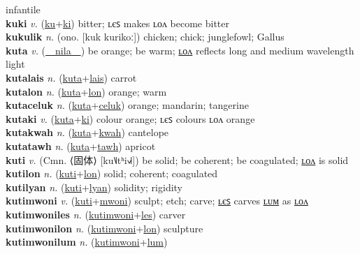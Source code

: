 infantile \label{kukamak} \\
\textbf{kuki} \textit{v.} (\hyperref[ku]{ku}+\hyperref[ki]{ki})
bitter; ʟєꜱ makes ʟᴏᴧ become bitter \label{kuki} \\
\textbf{kukulik} \textit{n.} (ono. [kuk kurikoː])
chicken; chick; junglefowl; Gallus \label{kukulik} \\
\textbf{kuta} \textit{v.} (\hyperref[nila]{~~nila~~})
be orange; be warm; \hyperref[kutalon]{ʟᴏᴧ} reflects long and medium wavelength light \label{kuta} \\
\textbf{kutalais} \textit{n.} (\hyperref[kuta]{kuta}+\hyperref[lais]{lais})
carrot \label{kutalais} \\
\textbf{kutalon} \textit{n.} (\hyperref[kuta]{kuta}+\hyperref[lon]{lon})
orange; warm \label{kutalon} \\
\textbf{kutaceluk} \textit{n.} (\hyperref[kuta]{kuta}+\hyperref[celuk]{celuk})
orange; mandarin; tangerine \label{kutaceluk} \\
\textbf{kutaki} \textit{v.} (\hyperref[kuta]{kuta}+\hyperref[ki]{ki})
colour orange; ʟєꜱ colours ʟᴏᴧ orange \label{kutaki} \\
\textbf{kutakwah} \textit{n.} (\hyperref[kuta]{kuta}+\hyperref[kwah]{kwah})
cantelope \label{kutakwah} \\
\textbf{kutatawh} \textit{n.} (\hyperref[kuta]{kuta}+\hyperref[tawh]{tawh})
apricot \label{kutatawh} \\
\textbf{kuti} \textit{v.} (Cmn. ⟨固体⟩ [ku˥˩tʰi˧˩˧])
be solid; be coherent; be coagulated; \hyperref[kutilon]{ʟᴏᴧ} is solid \label{kuti} \\
\textbf{kutilon} \textit{n.} (\hyperref[kuti]{kuti}+\hyperref[lon]{lon})
solid; coherent; coagulated \label{kutilon} \\
\textbf{kutilyan} \textit{n.} (\hyperref[kuti]{kuti}+\hyperref[lyan]{lyan})
solidity; rigidity \label{kutilyan} \\
\textbf{kutimwoni} \textit{v.} (\hyperref[kuti]{kuti}+\hyperref[mwoni]{mwoni})
sculpt; etch; carve; \hyperref[kutimwoniles]{ʟєꜱ} carves \hyperref[kutimwonilum]{ʟᴜᴍ} as \hyperref[kutimwonilon]{ʟᴏᴧ} \label{kutimwoni} \\
\textbf{kutimwoniles} \textit{n.} (\hyperref[kutimwoni]{kutimwoni}+\hyperref[les]{les})
carver \label{kutimwoniles} \\
\textbf{kutimwonilon} \textit{n.} (\hyperref[kutimwoni]{kutimwoni}+\hyperref[lon]{lon})
sculpture \label{kutimwonilon} \\
\textbf{kutimwonilum} \textit{n.} (\hyperref[kutimwoni]{kutimwoni}+\hyperref[lum]{lum})
